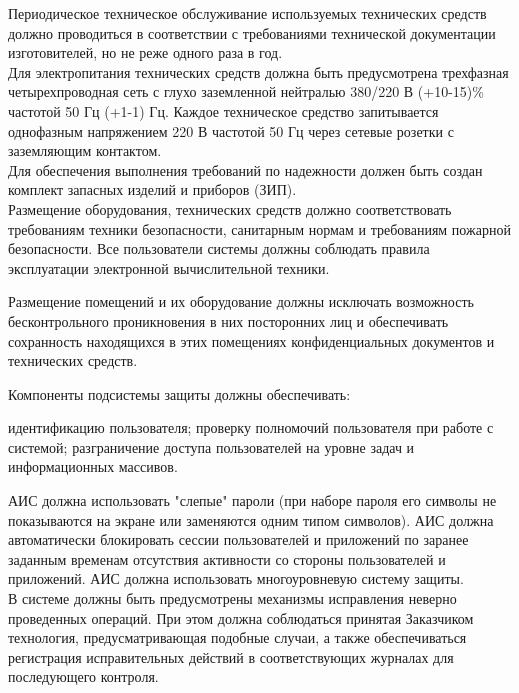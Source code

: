 \documentclass[russian, utf8, 12pt,pointsubsection,floatsubsection]{eskdtext}
\begin{document}
Периодическое техническое обслуживание используемых технических средств должно проводиться в соответствии с требованиями технической документации изготовителей, но не реже одного раза в год.\\

Для электропитания технических средств должна быть предусмотрена трехфазная четырехпроводная сеть с глухо заземленной нейтралью 380/220 В (+10-15)\% частотой 50 Гц (+1-1) Гц. Каждое техническое средство запитывается однофазным напряжением 220 В частотой 50 Гц через сетевые розетки с заземляющим контактом.\\

Для обеспечения выполнения требований по надежности должен быть создан комплект запасных изделий и приборов (ЗИП).\\

Размещение оборудования, технических средств должно соответствовать требованиям техники безопасности, санитарным нормам и требованиям пожарной безопасности. Все пользователи системы должны соблюдать правила эксплуатации электронной вычислительной техники.


Размещение помещений и их оборудование должны исключать возможность бесконтрольного проникновения в них посторонних лиц и обеспечивать сохранность находящихся в этих помещениях конфиденциальных документов и технических средств.

Компоненты подсистемы защиты должны обеспечивать:
\begin{enumerate}
идентификацию пользователя;
проверку полномочий пользователя при работе с системой;
разграничение доступа пользователей на уровне задач и информационных массивов.
\end{enumerate}

АИС должна использовать "слепые" пароли (при наборе пароля его символы не показываются на экране или заменяются одним типом символов). АИС должна автоматически блокировать сессии пользователей и приложений по заранее заданным временам отсутствия активности со стороны пользователей и приложений. АИС должна использовать многоуровневую систему защиты.\\

В системе должны быть предусмотрены механизмы исправления неверно проведенных операций. При этом должна соблюдаться принятая Заказчиком технология, предусматривающая подобные случаи, а также обеспечиваться регистрация исправительных действий в соответствующих журналах для последующего контроля.
\end{document}
